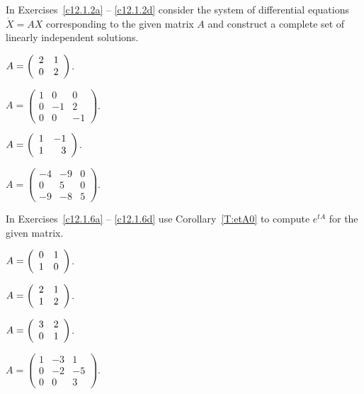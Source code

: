 \noindent  In Exercises~\ref{c12.1.2a} -- \ref{c12.1.2d} consider the system 
of differential equations $\dot X = AX$ corresponding to the given matrix 
$A$ and construct a complete set of linearly independent solutions.
\begin{exercise} \label{c12.1.2a}
$A=\left(\begin{array}{rr} 2 & 1\\ 0 &2\end{array}\right)$.
\end{exercise}
\begin{exercise} \label{c12.1.2b}
$A=\left(\begin{array}{rrr} 1 & 0 & 0\\ 0 & -1 & 2 \\ 0 & 0 & -1
\end{array}\right)$.
\end{exercise}
\begin{exercise} \label{c12.1.2c}
$A=\left(\begin{array}{rr} 1 & -1\\ 1 &3\end{array}\right)$.
\end{exercise}
\begin{exercise} \label{c12.1.2d}
$A=\left(\begin{array}{rrr} -4 & -9 & 0\\ 0 & 5 & 0 \\ -9 & -8 & 5
\end{array}\right)$.
\end{exercise}

\noindent  In Exercises~\ref{c12.1.6a} -- \ref{c12.1.6d} use Corollary~\ref{T:etA0} to compute $e^{tA}$ for the given matrix.
\begin{exercise} \label{c12.1.6a}
$A = \left(\begin{array}{rr} 0 & 1\\ 1 &0\end{array}\right)$.
\end{exercise}
\begin{exercise} \label{c12.1.6b}
$A = \left(\begin{array}{rr} 2 & 1\\ 1 &2\end{array}\right)$.
\end{exercise}
\begin{exercise} \label{c12.1.6c}
$A = \left(\begin{array}{rr} 3 & 2\\ 0 &1\end{array}\right)$.
\end{exercise}
\begin{exercise} \label{c12.1.6d}
$A = \left(\begin{array}{rrr} 1 & -3 & 1\\ 0 & -2 & -5 \\ 0 & 0 & 3
\end{array}\right)$.
\end{exercise}


\CEXER

